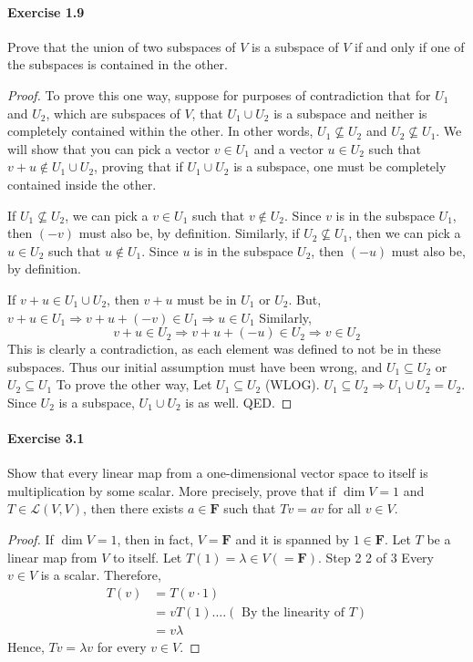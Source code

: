 \documentclass{article}
\theoremstyle{definition}
\begin{document}
\paragraph{Exercise 1.9} Prove that the union of two subspaces of $V$ is a subspace of $V$ if and only if one of the subspaces is contained in the other.
\begin{proof}
    To prove this one way, suppose for purposes of contradiction that for $U_1$ and $U_2$, which are subspaces of $V$, that $U_1 \cup U_2$ is a subspace and neither is completely contained within the other. In other words, $U_1 \nsubseteq U_2$ and $U_2 \nsubseteq U_1$. We will show that you can pick a vector $v \in U_1$ and a vector $u \in U_2$ such that $v+u \notin U_1 \cup U_2$, proving that if $U_1 \cup U_2$ is a subspace, one must be completely contained inside the other.

If $U_1 \nsubseteq U_2$, we can pick a $v \in U_1$ such that $v \notin U_2$. Since $v$ is in the subspace $U_1$, then $(-v)$ must also be, by definition. Similarly, if $U_2 \nsubseteq U_1$, then we can pick a $u \in U_2$ such that $u \notin U_1$. Since $u$ is in the subspace $U_2$, then $(-u)$ must also be, by definition.

If $v+u \in U_1 \cup U_2$, then $v+u$ must be in $U_1$ or $U_2$. But, $v+u \in U_1 \Rightarrow v+u+(-v) \in U_1 \Rightarrow u \in U_1$
Similarly,
$$
v+u \in U_2 \Rightarrow v+u+(-u) \in U_2 \Rightarrow v \in U_2
$$
This is clearly a contradiction, as each element was defined to not be in these subspaces. Thus our initial assumption must have been wrong, and $U_1 \subseteq U_2$ or $U_2 \subseteq U_1$
To prove the other way, Let $U_1 \subseteq U_2$ (WLOG). $U_1 \subseteq U_2 \Rightarrow U_1 \cup U_2=U_2$. Since $U_2$ is a subspace, $U_1 \cup U_2$ is as well. QED.
\end{proof}



\paragraph{Exercise 3.1} Show that every linear map from a one-dimensional vector space to itself is multiplication by some scalar. More precisely, prove that if $\operatorname{dim} V=1$ and $T \in \mathcal{L}(V, V)$, then there exists $a \in \mathbf{F}$ such that $T v=a v$ for all $v \in V$.
\begin{proof}
    If $\operatorname{dim} V=1$, then in fact, $V=\mathbf{F}$ and it is spanned by $1 \in \mathbf{F}$.
Let $T$ be a linear map from $V$ to itself. Let $T(1)=\lambda \in V(=\mathbf{F})$.
Step 2
2 of 3
Every $v \in V$ is a scalar. Therefore,
$$
\begin{aligned}
T(v) & =T(v \cdot 1) \\
& =v T(1) \ldots .(\text { By the linearity of } T) \\
& =v \lambda
\end{aligned}
$$
Hence, $T v=\lambda v$ for every $v \in V$.
\end{proof}
\end{document}
